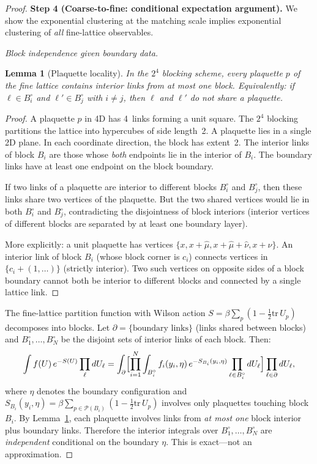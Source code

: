 \documentclass[11pt]{article}
\newtheorem{lemma}[theorem]{Lemma}
\theoremstyle{definition}
\newcommand{\tr}{\mathrm{tr}}
\begin{document}
\begin{proof}
\medskip\noindent\textbf{Step 4 (Coarse-to-fine: conditional
expectation argument).}
We show the exponential clustering at the matching scale implies
exponential clustering of \emph{all} fine-lattice observables.

\emph{Block independence given boundary data.}

\begin{lemma}[Plaquette locality]\label{lem:plaquette-block}
In the $2^4$ blocking scheme, every plaquette $p$ of the fine
lattice contains interior links from \emph{at most one} block.
Equivalently: if $\ell\in B_i^\circ$ and $\ell'\in B_j^\circ$
with $i\ne j$, then $\ell$ and $\ell'$ do not share a plaquette.
\end{lemma}

\begin{proof}
A plaquette $p$ in 4D has 4~links forming a unit square.
The $2^4$ blocking partitions the lattice into hypercubes of
side length~2.  A plaquette lies in a single 2D plane.  In each
coordinate direction, the block has extent~2.  The interior
links of block $B_i$ are those whose \emph{both} endpoints lie
in the interior of $B_i$.  The boundary links have at least one
endpoint on the block boundary.

If two links of a plaquette are interior to different blocks
$B_i^\circ$ and $B_j^\circ$, then these links share two
vertices of the plaquette.  But the two shared vertices would
lie in both $B_i^\circ$ and $B_j^\circ$, contradicting the
disjointness of block interiors (interior vertices of different
blocks are separated by at least one boundary layer).

More explicitly: a unit plaquette has vertices
$\{x,x+\hat\mu,x+\hat\mu+\hat\nu,x+\hat\nu\}$.  An interior
link of block $B_i$ (whose block corner is $c_i$) connects
vertices in $\{c_i+(1,\ldots)\}$ (strictly interior).
Two such vertices on opposite sides of a block boundary cannot
both be interior to different blocks and connected by a single
lattice link.
\end{proof}

The fine-lattice partition function with Wilson action
$S=\beta\sum_p(1-\frac{1}{2}\tr\,U_p)$ decomposes into blocks.
Let $\partial=\{\text{boundary links}\}$ (links shared between
blocks) and $B_1^\circ,\ldots,B_N^\circ$ be the disjoint sets of
interior links of each block.  Then:
\begin{equation}\label{eq:block-factor}
\int f(U)\,e^{-S(U)}\prod_\ell dU_\ell
=\int_{\partial}\Bigl[\prod_{i=1}^N
\int_{B_i^\circ}f_i(y_i,\eta)\,
e^{-S_{B_i}(y_i,\eta)}\prod_{\ell\in B_i^\circ}dU_\ell
\Bigr]\prod_{\ell\in\partial}dU_\ell,
\end{equation}
where $\eta$ denotes the boundary configuration and
$S_{B_i}(y_i,\eta)=\beta\sum_{p\in\mathcal{P}(B_i)}
(1-\frac{1}{2}\tr\,U_p)$ involves only plaquettes touching
block~$B_i$.  By Lemma~\ref{lem:plaquette-block}, each plaquette
involves links from \emph{at most one} block interior plus boundary
links.  Therefore the interior integrals over $B_1^\circ,\ldots,B_N^\circ$
are \emph{independent} conditional on the boundary $\eta$.
This is exact---not an approximation.


\end{proof}
\end{document}
